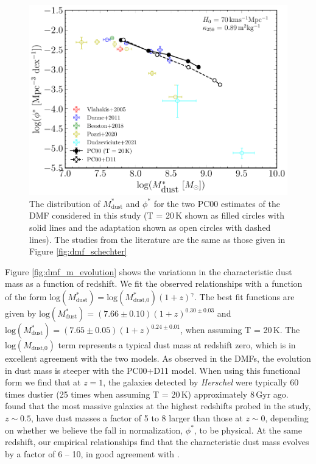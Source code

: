\begin{figure}
	\centering
	\includegraphics[width=0.75\columnwidth]{Figures/dmf_schechter_parameters.pdf}
	\caption{The distribution of $M_{\textrm{dust}}^*$ and $\phi^*$ for the two PC00 estimates of the DMF considered in this study (T = 20\,K shown as filled circles with solid lines and the \citealt{Dunne_2011} adaptation shown as open circles with dashed lines). The studies from the literature are the same as those given in Figure \ref{fig:dmf_schechter}}
	\label{fig:dmf_schechter_parameters}
\end{figure}

Figure \ref{fig:dmf_m_evolution} shows the variationn in the characteristic dust mass as a function of redshift. We fit the observed relationships with a function of the form $\textrm{log}(M_{\textrm{dust}}^*) = \textrm{log}(M_{\textrm{dust,0}}^*)(1+z)^\gamma$. The best fit functions are given by $\textrm{log}(M_{\textrm{dust}}^*) = (7.66\pm0.10)(1+z)^{0.30\pm0.03}$ and $\textrm{log}(M_{\textrm{dust}}^*) = (7.65\pm0.05)(1+z)^{0.24\pm0.01}$, when assuming T = 20\,K. The $\textrm{log}(M_{\textrm{dust,0}})$ term represents a typical dust mass at redshift zero, which is in excellent agreement with the two models. As observed in the DMFs, the evolution in dust mass is steeper with the PC00+D11 model. When using this functional form we find that at $z = 1$, the galaxies detected by \textit{Herschel} were typically 60 times dustier (25 times when assuming T = 20\,K) approximately 8\,Gyr ago. \citealt{Dunne_2011} found that the most massive galaxies at the highest redshifts probed in the study, $z \sim 0.5$, have dust masses a factor of 5 to 8 larger than those at $z \sim 0$, depending on whether we believe the fall in normalization, $\phi^*$, to be physical. At the same redshift, our empirical relationships find that the characteristic dust mass evolves by a factor of 6 -- 10, in good agreement with \citealt{Dunne_2011}.

